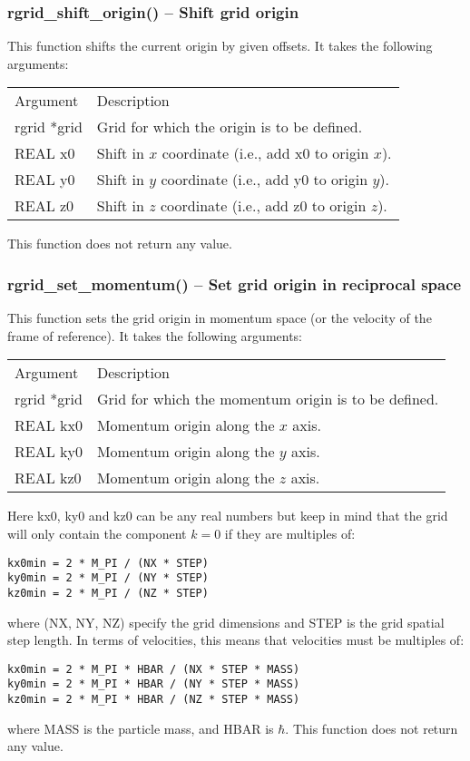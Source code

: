 \documentclass[12pt,letterpaper]{article}
\begin{document}
\subsubsection{rgrid\_shift\_origin() -- Shift grid origin}

This function shifts the current origin by given offsets. It takes the following arguments:
\begin{longtable}{p{} p{}}
Argument & Description\\
\cline{1-2}
rgrid *grid & Grid for which the origin is to be defined.\\
REAL x0 & Shift in $x$ coordinate (i.e., add x0 to origin $x$).\\
REAL y0 & Shift in $y$ coordinate (i.e., add y0 to origin $y$).\\
REAL z0 & Shift in $z$ coordinate (i.e., add z0 to origin $z$).\\
\end{longtable}
\noindent
This function does not return any value.

\subsubsection{rgrid\_set\_momentum() -- Set grid origin in reciprocal space}

This function sets the grid origin in momentum space (or the velocity of the frame of reference). It takes the following arguments:
\begin{longtable}{p{} p{}}
Argument & Description\\
\cline{1-2}
rgrid *grid & Grid for which the momentum origin is to be defined.\\
REAL kx0 & Momentum origin along the $x$ axis.\\
REAL ky0 & Momentum origin along the $y$ axis.\\
REAL kz0 & Momentum origin along the $z$ axis.\\
\end{longtable}
\noindent
Here kx0, ky0 and kz0 can be any real numbers but keep in mind that the grid will only contain the component $k = 0$ if they are multiples of:
\begin{verbatim} 
kx0min = 2 * M_PI / (NX * STEP)
ky0min = 2 * M_PI / (NY * STEP)
kz0min = 2 * M_PI / (NZ * STEP)
\end{verbatim}
\noindent
where (NX, NY, NZ) specify the grid dimensions and STEP is the grid spatial step length. In terms of velocities, this means that velocities must be multiples of:
\begin{verbatim} 
kx0min = 2 * M_PI * HBAR / (NX * STEP * MASS)
ky0min = 2 * M_PI * HBAR / (NY * STEP * MASS)
kz0min = 2 * M_PI * HBAR / (NZ * STEP * MASS)
\end{verbatim}
where MASS is the particle mass, and HBAR is $\hbar$. This function does not return any value.
\end{document}
